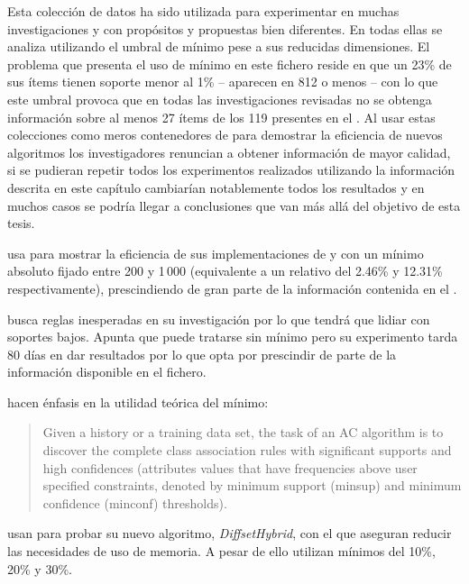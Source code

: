 \ABIERTO
Esta colección de datos ha sido utilizada para experimentar en muchas investigaciones y con propósitos y propuestas bien diferentes. En todas ellas se analiza utilizando el umbral de \soporte mínimo pese a sus reducidas dimensiones. El problema que presenta el uso de \soporte mínimo en este fichero reside en que un 23\% de sus ítems tienen soporte menor al 1\% -- aparecen en 812 \transacciones o menos -- con lo que este umbral provoca que en todas las investigaciones revisadas no se obtenga información sobre al menos 27 ítems de los 119 presentes en el \dataset. Al usar estas colecciones como meros contenedores de \transacciones para demostrar la eficiencia de nuevos algoritmos los investigadores renuncian a obtener información de mayor calidad, si se pudieran repetir todos los experimentos realizados utilizando la información descrita en este capítulo cambiarían notablemente todos los resultados y en muchos casos se podría llegar a conclusiones que van más allá del objetivo de esta tesis.


\citet{Borgelt-EfficientImplementationsOfAprioriAndEclat-2004} usa \mushroom para mostrar la eficiencia de sus implementaciones de \apriori y  con un \soporte mínimo absoluto fijado entre 200 y 1\,000 \transacciones (equivalente a un \soporte relativo del 2.46\% y 12.31\% respectivamente), prescindiendo de gran parte de la información contenida en el \dataset.

\citet{Suzuki-DiscoveringInterestingExceptionRulesWithRulePair-2004} busca reglas inesperadas en su investigación por lo que tendrá que lidiar con soportes bajos. Apunta que \mushroom puede tratarse sin \soporte mínimo pero su experimento tarda 80 días en dar resultados por lo que opta por prescindir de parte de la información disponible en el fichero.

\citet{ThabtahCowlingHammoud-ImprovingRuleSorting-2006} hacen énfasis en la utilidad teórica del \soporte mínimo:
\begin{quote}
Given a history or a training data set, the task of an AC algorithm is to discover the complete class association rules with significant supports and high confidences (attributes values that have frequencies above user specified constraints, denoted by minimum support (minsup) and minimum confidence (minconf) thresholds).
\end{quote}

\citet{LuoZhang-AnEfficientFIMAlgorithm-2007} usan \mushroom para probar su nuevo algoritmo, \emph{DiffsetHybrid}, con el que aseguran reducir las necesidades de uso de memoria. A pesar de ello utilizan \soportes mínimos del 10\%, 20\% y 30\%.

